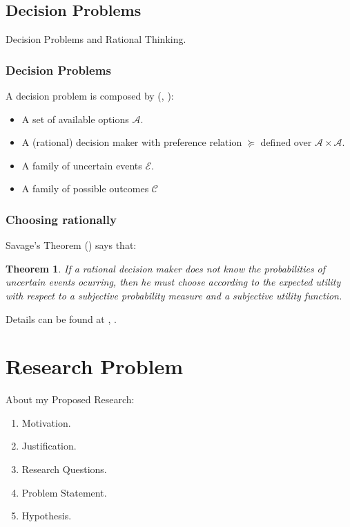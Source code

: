\documentclass{beamer}
\theoremstyle{plain}
\newtheorem{teo}{Theorem}
\begin{document}
\subsection{Decision Problems}
	\begin{frame}
	Decision Problems and Rational Thinking.
	\end{frame}
	\begin{frame}
	\frametitle{Decision Problems}
	A decision problem is composed by (\cite{bernardo2000bayesian}, \cite{gilboa2009decision}):
	\begin{itemize}
	\item A set of available options $\mathcal{A}$.
	\item A (rational) decision maker with preference relation $\succeq$ defined over $\mathcal{A} \times \mathcal{A}$.
	\item A family of uncertain events $\mathcal{E}$.
    \item A family of possible outcomes $\mathcal{C}$
	\end{itemize}
	\end{frame}
	
	\begin{frame}
	\frametitle{Choosing rationally}
	Savage's Theorem (\cite{savage1954the}) says that:
\begin{teo}	
	If a rational decision maker does not know the probabilities of uncertain events ocurring, then he must choose according to the expected utility with respect to a \textit{subjective} probability measure and a \textit{subjective} utility function.
\end{teo}
Details can be found at \cite{bernardo2000bayesian}, \cite{gilboa2009decision}.
	\end{frame}

\section{Research Problem}
\begin{frame}
About my Proposed Research:
\begin{enumerate}
\item Motivation.
\item Justification.
\item Research Questions.
\item Problem Statement.
\item Hypothesis.
\end{enumerate}
\end{frame}
\end{document}
